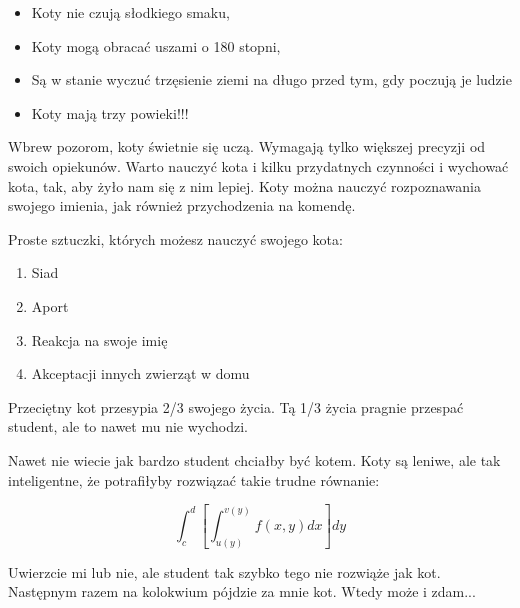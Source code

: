 \begin{flushleft}
\newpage
\vspace {0.80cm}




\begin{itemize}
  \item Koty nie czują słodkiego smaku,
  \item Koty mogą obracać uszami o 180 stopni,
  \item Są w stanie wyczuć trzęsienie ziemi na długo przed tym, gdy poczują je ludzie
  \item Koty mają trzy powieki!!!
\end{itemize}

\maketitle 
    Wbrew pozorom, koty świetnie się uczą. Wymagają tylko większej precyzji od swoich opiekunów. Warto nauczyć kota i kilku przydatnych czynności i wychować kota, tak, aby żyło nam się z nim lepiej. Koty można nauczyć rozpoznawania swojego imienia, jak również przychodzenia na komendę.

\noindent Proste sztuczki, których możesz nauczyć swojego kota:

\begin{enumerate}
  \item Siad
  \item Aport
   \item Reakcja na swoje imię
    \item Akceptacji innych zwierząt w domu
\end{enumerate}


Przeciętny kot przesypia 2/3 swojego życia. Tą 1/3 życia pragnie przespać student, ale to nawet mu nie wychodzi.

Nawet nie wiecie jak bardzo student chciałby być kotem. Koty są leniwe, ale tak inteligentne, że potrafiłyby rozwiązać takie trudne równanie:  


$$\int_{c}^{d} \left[ \int_{u(y)}^{v(y)} f(x,y)dx \right] dy$$

Uwierzcie mi lub nie, ale student tak szybko tego nie rozwiąże jak kot. 
Następnym razem na kolokwium pójdzie za mnie kot. Wtedy może i zdam...

\end{flushleft}
